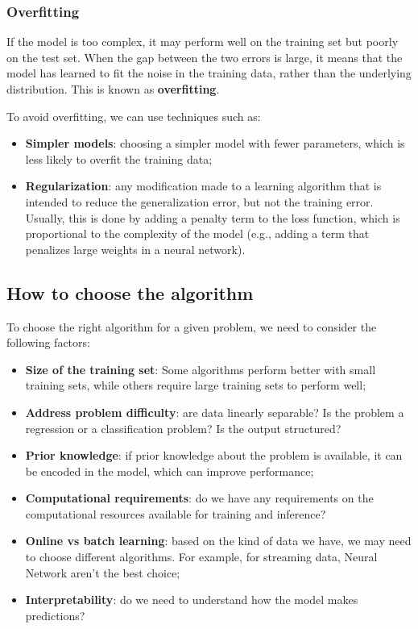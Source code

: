 \subsubsection{Overfitting}
If the model is too complex, it may perform well on the training set but poorly on the test set. 
When the gap between the two errors is large, it means that the model has learned to fit the noise in the training data, rather than the underlying distribution.
This is known as \textbf{overfitting}.

To avoid overfitting, we can use techniques such as:
\begin{itemize}
    \item \textbf{Simpler models}: choosing a simpler model with fewer parameters, which is less likely to overfit the training data;
    \item \textbf{Regularization}: any modification made to a learning algorithm that is intended to reduce the generalization error, but not the training error. Usually,
    this is done by adding a penalty term to the loss function, which is proportional to the complexity of the model (e.g., adding a term that penalizes large weights in a neural network).
\end{itemize}

\subsection{How to choose the algorithm}
To choose the right algorithm for a given problem, we need to consider the following factors:
\begin{itemize}
    \item \textbf{Size of the training set}: Some algorithms perform better with small training sets, while others require large training sets to perform well;
    \item \textbf{Address problem difficulty}: are data linearly separable? Is the problem a regression or a classification problem? Is the output structured?
    \item \textbf{Prior knowledge}: if prior knowledge about the problem is available, it can be encoded in the model, which can improve performance;
    \item \textbf{Computational requirements}: do we have any requirements on the computational resources available for training and inference?
    \item \textbf{Online vs batch learning}: based on the kind of data we have, we may need to choose different algorithms. For example, for streaming data,
    Neural Network aren't the best choice;
    \item \textbf{Interpretability}: do we need to understand how the model makes predictions?
\end{itemize}